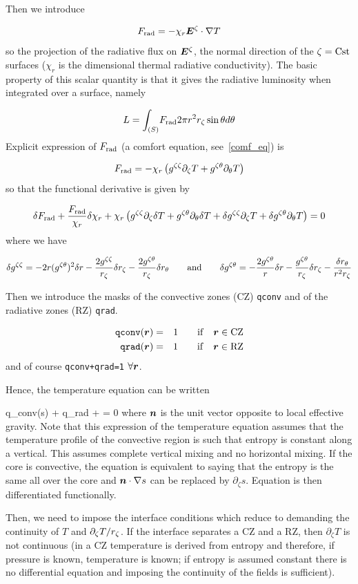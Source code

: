 Then we introduce

\[ \frad = -\chi_r\vE^\zeta\cdot\na T\]
so the projection of the radiative flux on $\vE^\zeta$, the normal
direction of the $\zeta={\rm Cst}$ surfaces ($\chi_r$ is the dimensional thermal
radiative conductivity). The basic property of this
scalar quantity is that it gives the radiative luminosity when
integrated over a surface, namely

\[ L= \int_{(S)}\! F_{\rm rad} 2\pi r^2r_\zeta\sin\theta d\theta\]
Explicit expression of $F_{\rm rad}$  (a comfort equation, see~\ref{comf_eq}) is

\[ F_{\rm rad} = -\chi_r\left(g^{\zeta\zeta}\partial_\zeta T + g^{\zeta\theta}\partial_\theta T \right)\]
so that the functional derivative is given by

\[ \delta F_{\rm rad} +\frac{F_{\rm rad}}{\chi_r}\delta\chi_r +\chi_r\left(
g^{\zeta\zeta}\partial_\zeta\delta T + g^{\zeta\theta}\partial_\theta\delta T +
\delta g^{\zeta\zeta}\partial_\zeta T + \delta g^{\zeta\theta}\partial_\theta T\right) = 0\]
where we have

\[ \delta g^{\zeta\zeta} = -2r(g^{\zeta\theta})^2\delta r -\frac{2g^{\zeta\zeta}}{r_\zeta}\delta r_\zeta
-\frac{2g^{\zeta\theta}}{r_\zeta}\delta r_\theta\qquad {\rm and}\qquad
\delta g^{\zeta\theta} = -\frac{2g^{\zeta\theta}}{r}\delta r -\frac{g^{\zeta\theta}}{r_\zeta}\delta r_\zeta
-\frac{\delta r_\theta}{r^2r_\zeta}\]

Then we introduce the masks of the convective zones (CZ) {\tt qconv} and
of the radiative zones (RZ) {\tt qrad}.

\begin{eqnarray} {\tt qconv}(\vr) &=& 1 \qquad {\rm if}\quad \vr \in {\rm CZ}\nonumber \\
{\tt qrad}(\vr) &=& 1 \qquad {\rm if}\quad \vr \in {\rm RZ} \nonumber
\end{eqnarray}
and of course {\tt qconv+qrad=1} $\forall \vr$.

Hence, the temperature equation can be written

\beq q_{\rm conv}(\vn\cdot\na s) +  q_{\rm rad}\lp{} + \Lambda\rho{}\rp = 0
where $\vn$ is the unit vector opposite to local effective gravity. Note
that this expression of the temperature equation assumes that the
temperature profile of the convective region is such that entropy is
constant along a vertical. This assumes complete vertical mixing and no
horizontal mixing. If the core is convective, the equation is equivalent
to saying that the entropy is the same all over the core and
$\vn\cdot\na s$ can be replaced by $\partial_\zeta s$. Equation
 is then differentiated functionally.

Then, we need to impose the interface conditions which reduce to
demanding the continuity of $T$ and $\partial_\zeta T/r_\zeta$. If the
interface separates a CZ and a RZ, then $\partial_\zeta T$ is not
continuous (in a CZ temperature is derived from entropy and therefore,
if pressure is known, temperature is known; if entropy is assumed
constant there is no differential equation and imposing the continuity
of the fields is sufficient).

